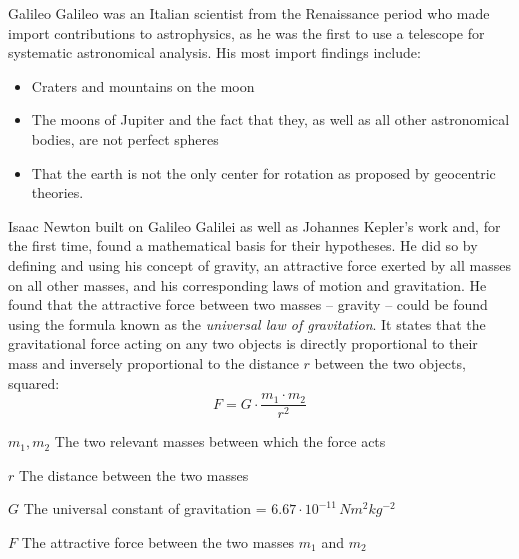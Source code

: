 
Galileo Galileo was an Italian scientist from the Renaissance period who made import contributions to astrophysics, as he was the first to use a telescope for systematic astronomical analysis. His most import findings include:

\begin{itemize}
	\item Craters and mountains on the moon
	\item The moons of Jupiter and the fact that they, as well as all other astronomical bodies, are not perfect spheres
	\item That the earth is not the only center for rotation as proposed by geocentric theories.
\end{itemize}

\pagebreak


Isaac Newton built on Galileo Galilei as well as Johannes Kepler's work and, for the first time, found a mathematical basis for their hypotheses. He did so by defining and using his concept of gravity, an attractive force exerted by all masses on all other masses, and his corresponding laws of motion and gravitation. He found that the attractive force between two masses -- gravity -- could be found using the formula known as the \emph{universal law of gravitation}. It states that the gravitational force acting on any two objects is directly proportional to their mass and inversely proportional to the distance $r$ between the two objects, squared: $$F = G \cdot \frac{m_1 \cdot m_2}{r^2}$$

$m_1, m_2$  The two relevant masses between which the force acts

$r$  The distance between the two masses

$G$  The universal constant of gravitation = $6.67 \cdot 10^{-11} \, Nm^2 kg^{-2}$

$F$  The attractive force between the two masses $m_1$ and $m_2$

\vspace{\parskip}

